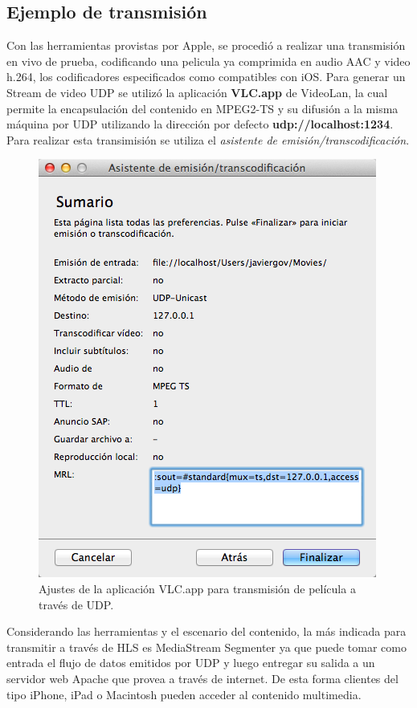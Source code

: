 	\subsection{Ejemplo de transmisión}

Con las herramientas provistas por Apple, se procedió a realizar una transmisión en vivo de prueba, codificando una pelicula ya comprimida en audio AAC y video h.264, los codificadores especificados como compatibles con iOS. Para generar un Stream de video UDP se utilizó la aplicación \textbf{VLC.app} de VideoLan, la cual permite la encapsulación del contenido en MPEG2-TS y su difusión a la misma máquina por UDP utilizando la dirección por defecto \textbf{udp://localhost:1234}. Para realizar esta transimisión se utiliza el \textit{asistente de emisión/transcodificación}.\\

\begin{figure}[H]
	\centering
	\includegraphics[scale=0.5]{imgs/vlc_transmission.png}
	\caption{Ajustes de la aplicación VLC.app para transmisión de película a través de UDP.}
	\label{vlc_transmission}	
\end{figure}


Considerando las herramientas y el escenario del contenido, la más indicada para transmitir a través de HLS es MediaStream Segmenter ya que puede tomar como entrada el flujo de datos emitidos por UDP y luego entregar su salida a un servidor web Apache que provea a través de internet. De esta forma clientes del tipo iPhone, iPad o Macintosh pueden acceder al contenido multimedia.\\


